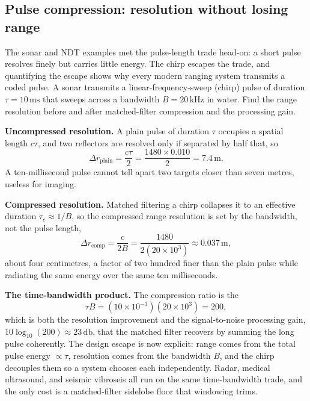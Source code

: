 

\subsection{Pulse compression: resolution without losing range}

The sonar and NDT examples met the pulse-length trade head-on: a short pulse
resolves finely but carries little energy. The chirp escapes the trade, and
quantifying the escape shows why every modern ranging system transmits a
coded pulse. A sonar transmits a linear-frequency-sweep (chirp) pulse of
duration $\tau = 10\,\si{\milli\second}$ that sweeps across a bandwidth
$B = 20\,\si{\kilo\hertz}$ in water. Find the range resolution before and
after matched-filter compression and the processing gain.

\textbf{Uncompressed resolution.} A plain pulse of duration $\tau$ occupies a
spatial length $c\tau$, and two reflectors are resolved only if separated by
half that, so
\[
\Delta r_{\text{plain}} = \frac{c\tau}{2}
                       = \frac{1480\times 0.010}{2}
                       = 7.4\,\si{\meter}.
\]
A ten-millisecond pulse cannot tell apart two targets closer than seven
metres, useless for imaging.

\textbf{Compressed resolution.} Matched filtering a chirp collapses it to an
effective duration $\tau_c \approx 1/B$, so the compressed range resolution
is set by the bandwidth, not the pulse length,
\[
\Delta r_{\text{comp}} = \frac{c}{2B}
                      = \frac{1480}{2(20\times 10^3)}
                      \approx 0.037\,\si{\meter},
\]
about four centimetres, a factor of two hundred finer than the plain pulse
while radiating the same energy over the same ten milliseconds.

\textbf{The time-bandwidth product.} The compression ratio is the
\[
\tau B = (10\times 10^{-3})(20\times 10^3) = 200 ,
\]
which is both the resolution improvement and the signal-to-noise processing
gain, $10\log_{10}(200)\approx 23\,\si{\decibel}$, that the matched filter
recovers by summing the long pulse coherently. The design escape is now
explicit: range comes from the total pulse energy $\propto\tau$, resolution
comes from the bandwidth $B$, and the chirp decouples them so a system
chooses each independently. Radar, medical ultrasound, and seismic
vibroseis all run on the same time-bandwidth trade, and the only cost is a
matched-filter sidelobe floor that windowing trims.

